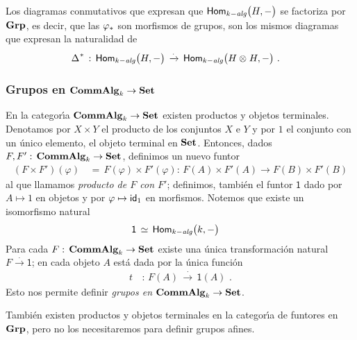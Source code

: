 \begin{obsGrupoDeMorfismos}\label{obs:grupodemorfismos}
	Los diagramas conmutativos que expresan que $\Homalg\big(H,-\big)$ se
	factoriza por $\Grp$, es decir, que las $\push\varphi$ son morfismos de
	grupos, son los mismos diagramas que expresan la naturalidad de
	\begin{align*}
		\pull\coproducto & \,:\,\Homalg\big(H,-\big)
			\,\xrightarrow{\cdot}\,
			\Homalg\big(H\tensor H,-\big)
		\text{ .}
	\end{align*}
\end{obsGrupoDeMorfismos}

\subsubsection{Grupos en $\CommAlg[k]\rightarrow\Set$}
En la categor\'{\i}a $\CommAlg[k]\rightarrow\Set$ existen productos y objetos
terminales. Denotamos por $X\times Y$ el producto de los conjuntos $X$ e $Y$ y
por $1$ el conjunto con un \'{u}nico elemento, el objeto terminal en $\Set$.
Entonces, dados $F,F':\,\CommAlg[k]\rightarrow\Set$, definimos un nuevo funtor
\begin{align*}
	(F\times F')(\varphi) & \,=\,F(\varphi)\times F'(\varphi):\,
		F(A)\times F'(A)\rightarrow F(B)\times F'(B)
\end{align*}
%
al que llamamos \emph{producto de $F$ con $F'$}; definimos, tambi\'{e}n el
funtor $\mathsf{1}$ dado por $A\mapsto 1$ en objetos y por
$\varphi\mapsto\id[1]$ en morfismos. Notemos que existe un isomorfismo natural
\begin{align*}
	\mathsf 1 & \,\simeq\,\Homalg\big(k,-\big)	
\end{align*}
%
Para cada $F:\,\CommAlg[k]\rightarrow\Set$ existe una \'{u}nica
transformaci\'{o}n natural $F\xrightarrow{\cdot}\mathsf{1}$; en cada objeto $A$
est\'{a} dada por la \'{u}nica funci\'{o}n
\begin{align*}
	t & \,:\, F(A)\,\xrightarrow{\cdot}\,\mathsf 1(A)
	\text{ .}
\end{align*}
%
Esto nos permite definir \emph{grupos en $\CommAlg[k]\rightarrow\Set$}.

\begin{obsProductosEnGrupos}\label{obs:productosengrupos}
	Tambi\'{e}n existen productos y objetos terminales en la categor\'{\i}a
	de funtores en $\Grp$, pero no los necesitaremos para definir grupos
	afines.
\end{obsProductosEnGrupos}

